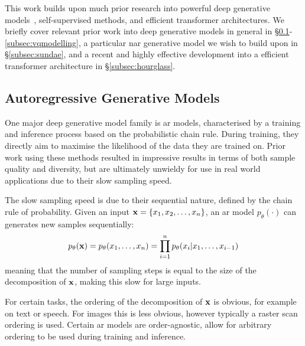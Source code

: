 This work builds upon much prior research into powerful deep generative
models~\cite{bondtaylor2021review}, self-supervised methods, and efficient
transformer architectures. We briefly cover relevant prior work into deep
generative models in general in \S\ref{subsec:agm}-\ref{subsec:vqmodelling}, a
particular \acrshort{nar} generative model we wish to build upon in
\S\ref{subsec:sundae}, and a recent and highly effective development into a
efficient transformer architecture in \S\ref{subsec:hourglass}.

\subsection{Autoregressive Generative Models}
\label{subsec:agm}
One major deep generative model family is \acrfull{ar} models, characterised
by a training and inference process based on the probabilistic chain rule.
During training, they directly aim to maximise the likelihood of the data they
are trained on. Prior work using these methods resulted in impressive results in
terms of both sample quality and diversity, but are ultimately unwieldy for use
in real world applications due to their slow sampling speed.

The slow sampling speed is due to their sequential nature, defined by the chain
rule of probability. Given an input $\mathbf{x} = \{ x_{1}, x_{2}, \dots,
x_{n} \}$, an \gls{ar} model $p_\theta(\cdot)$ can generates new
samples sequentially:
\begin{equation}\label{eq:ar}
    p_\theta(\mathbf{x}) = p_\theta(x_{1}, \dots, x_{n}) =
    \prod\limits^{n}_{i=1} p_\theta(x_{i} \vert x_{1}, \dots, x_{i-1})
\end{equation}
meaning that the number of sampling steps is equal to the size of the
decomposition of $\mathbf{x}$, making this slow for large inputs.

For certain tasks, the ordering of the decomposition of $\mathbf{x}$ is obvious, for
example on text or speech. For images this is less obvious, however typically a
raster scan ordering is used. Certain \gls{ar} models are order-agnostic,
allow for arbitrary ordering to be used during training and inference.


